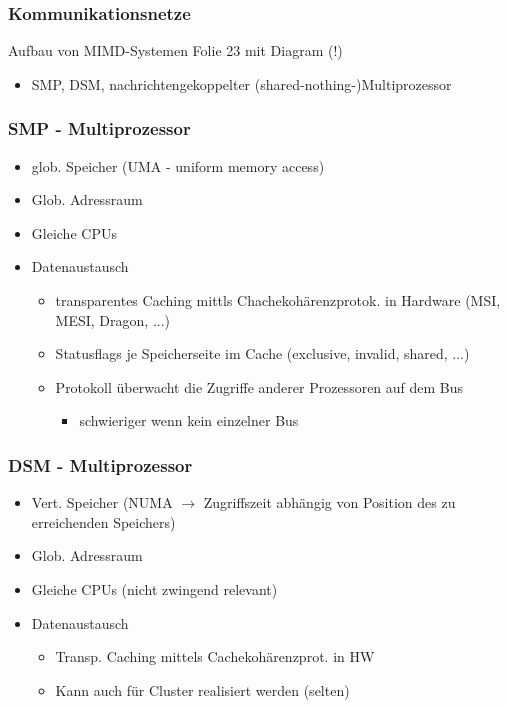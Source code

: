 \subsubsection{Kommunikationsnetze}
Aufbau von MIMD-Systemen
Folie 23 mit Diagram (!)

\begin{itemize}
	\item SMP, DSM, nachrichtengekoppelter (shared-nothing-)Multiprozessor
\end{itemize}


\subsubsection{SMP - Multiprozessor}

\begin{itemize}
	\item glob. Speicher (UMA - uniform memory access)
	\item Glob. Adressraum
	\item Gleiche CPUs
	\item Datenaustausch
		\begin{itemize}
			\item transparentes Caching mittls Chachekohärenzprotok. in Hardware (MSI, MESI, Dragon, ...)
			\item Statusflags je Speicherseite im Cache (exclusive, invalid, shared, ...)
			\item Protokoll überwacht die Zugriffe anderer Prozessoren auf dem Bus
				\begin{itemize}
					\item schwieriger wenn kein einzelner Bus
				\end{itemize}
		\end{itemize}
\end{itemize}


\subsubsection{DSM - Multiprozessor}

\begin{itemize}
	\item Vert. Speicher (NUMA $\rightarrow$ Zugriffszeit abhängig von Position des zu erreichenden Speichers)
	\item Glob. Adressraum
	\item Gleiche CPUs (nicht zwingend relevant)
	\item Datenaustausch
		\begin{itemize}
			\item Transp. Caching mittels Cachekohärenzprot. in HW
			\item Kann auch für Cluster realisiert werden (selten)
		\end{itemize}
\end{itemize}


